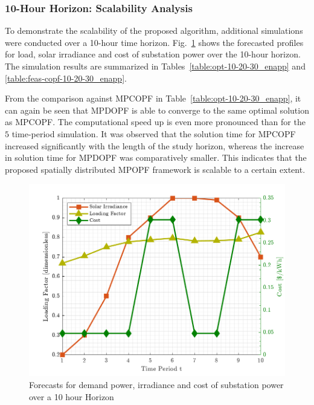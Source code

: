 \subsubsection{10-Hour Horizon: Scalability Analysis} \label{subsec:scalabilityAnalysis_enapp}

To demonstrate the scalability of the proposed algorithm, additional simulations were conducted over a 10-hour time horizon. Fig.~\ref{fig:inputCurve-10_enapp} shows the forecasted profiles for load, solar irradiance and cost of substation power over the 10-hour horizon. The simulation results are summarized in Tables~\ref{table:opt-10-20-30_enapp} and \ref{table:feas-copf-10-20-30_enapp}.

From the comparison against MPCOPF in Table~\ref{table:opt-10-20-30_enapp}, it can again be seen that MPDOPF is able to converge to the same optimal solution as MPCOPF. The computational speed up is even more pronounced than for the $5$ time-period simulation. 
It was observed that the solution time for MPCOPF increased significantly with the length of the study horizon, whereas the increase in solution time for MPDOPF was comparatively smaller. This indicates that the proposed spatially distributed MPOPF framework is scalable to a certain extent.

\begin{figure}[t]
    \centering
    \includegraphics[height=0.25\textheight]{figures/T10-inputCurves/InputCurves_Horizon_10.png}
    \caption{Forecasts for demand power, irradiance and cost of substation power over a 10 hour Horizon}
    \label{fig:inputCurve-10_enapp}
\end{figure}


